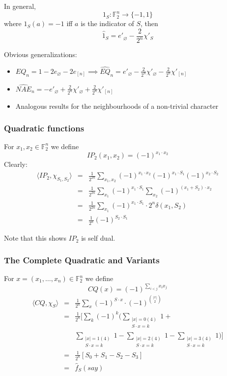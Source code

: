 \documentclass{sig-alternate}
\begin{document}
In general,				
\[ 1_{S}: \mathbb{F}_2^n \rightarrow \{-1,1\} \] where $1_S(a) = -1$ iff $a$ is the indicator of $S$, then
\[ \hat{1}_{S} = e'_{\varnothing} - \frac{2}{2^n}\chi'_S \]

Obvious generalizations:
\begin{itemize}
\item $EQ_n = 1 - 2e_{\varnothing} - 2e_{[n]} \implies \widehat{EQ}_n = e'_{\varnothing} - \frac{2}{2^n}\chi'_{\varnothing} - \frac{2}{2^n}\chi'_{[n]} $
\item $ \widehat{NAE}_n = -e'_{\varnothing} + \frac{2}{2^n}\chi'_{\varnothing} + \frac{2}{2^n}\chi'_{[n]} $
\item Analogous results for the neighbourhoods of a non-trivial character
\end{itemize}

\subsubsection{Quadratic functions}
\noindent For $x_1, x_2 \in \mathbb{F}^n_2$ we define \[IP_2(x_1, x_2) = (-1)^{x_1\cdot x_2}\]
Clearly:
\begin{eqnarray*}
\langle IP_2, \chi_{S_1, S_2}\rangle & = & \frac{1}{2^{2n}}\sum_{x_1, x_2} (-1)^{x_1\cdot x_2}(-1)^{x_1\cdot S_1}(-1)^{x_2\cdot S_2} \\
& = & \frac{1}{2^{2n}} \sum_{x_1}(-1)^{x_1\cdot S_1} \sum_{x_2}(-1)^{(x_1+S_2)\cdot x_2} \\
& = &  \frac{1}{2^{2n}} \sum_{x_1}(-1)^{x_1\cdot S_1}\cdot 2^n\delta(x_1,S_2) \\
& = &  \frac{1}{2^n} (-1)^{S_2\cdot S_1}
\end{eqnarray*}

Note that this shows $IP_2$ is self dual. \\

\subsubsection{The Complete Quadratic and Variants}

For $x = (x_1,\ldots, x_n) \in \mathbb{F}^n_2$ we define \[CQ(x) = (-1)^{\sum_{i<j}x_ix_j}\]
\begin{eqnarray*}
\langle CQ, \chi_S\rangle & = & \frac{1}{2^n}\sum_x (-1)^{S\cdot x}\cdot (-1)^{|x| \choose 2} \\
& = & \frac{1}{2^n}\big[\sum_{k}(-1)^k\big(\sum_{\substack{|x| = 0(4)\\S\cdot x = k}}1 + \\
& &	\sum_{\substack{|x|=1(4)\\S\cdot x = k}}1 - \sum_{\substack{|x|=2(4)\\S\cdot x = k}}1 -\sum_{\substack{|x|=3(4)\\S\cdot x = k}}1\big)\big] \\
& = & \frac{1}{2^n}[S_0 + S_1 - S_2 -S_3] \\
& = & \hat{f}_S (say)
\end{eqnarray*}
\end{document}
